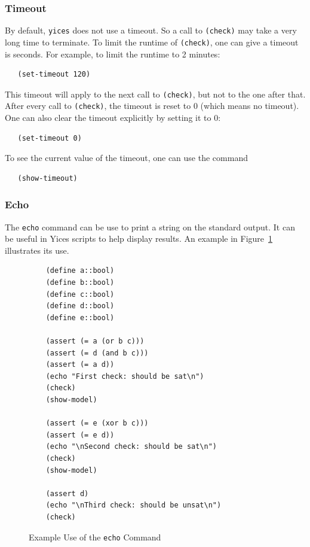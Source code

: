 \documentclass[11pt,twoside,fleqn,openright,titlepage]{cslreport}
\begin{document}
\subsubsection*{Timeout}

By default, \texttt{yices} does not use a timeout. So a call to
\texttt{(check)} may take a very long time to terminate. To limit the
runtime of \texttt{(check)}, one can give a timeout is seconds. For
example, to limit the runtime to 2 minutes:
\begin{small}
\begin{verbatim}
   (set-timeout 120)
\end{verbatim}
\end{small}
This timeout will apply to the next call to \texttt{(check)}, but not
to the one after that. After every call to \texttt{(check)}, the
timeout is reset to 0 (which means no timeout). One can also clear the
timeout explicitly by setting it to 0:
\begin{small}
\begin{verbatim}
   (set-timeout 0)
\end{verbatim}
\end{small}
To see the current value of the timeout, one can use the command
\begin{small}
\begin{verbatim}
   (show-timeout)
\end{verbatim}
\end{small}

\subsubsection*{Echo}

The \texttt{echo} command can be use to print a string on the standard
output. It can be useful in Yices scripts to help display
results. An example in Figure~\ref{example-echo} illustrates its use.

\begin{figure}
\begin{center}
\begin{footnotesize}
\begin{verbatim}
    (define a::bool)
    (define b::bool)
    (define c::bool)
    (define d::bool)
    (define e::bool)

    (assert (= a (or b c)))
    (assert (= d (and b c)))
    (assert (= a d))
    (echo "First check: should be sat\n")
    (check)
    (show-model)

    (assert (= e (xor b c)))
    (assert (= e d))
    (echo "\nSecond check: should be sat\n")
    (check)
    (show-model)

    (assert d)
    (echo "\nThird check: should be unsat\n")
    (check)
\end{verbatim}
\end{footnotesize}
\end{center}
\caption{Example Use of the \texttt{echo} Command}
\label{example-echo}
\end{figure}
\end{document}
